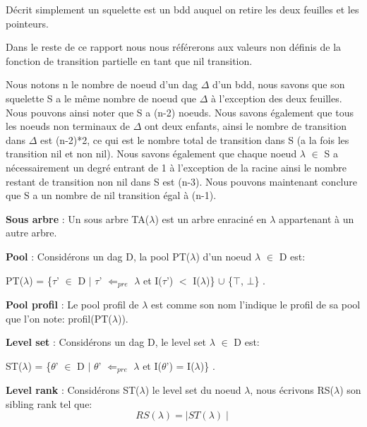 \documentclass[french]{article}
\begin{document}
Décrit simplement un squelette est un bdd auquel on retire les deux feuilles et les pointeurs.

Dans le reste de ce rapport nous nous référerons aux valeurs non définis de la fonction de transition partielle en tant que nil transition.
\vspace{5mm} 

Nous notons n le nombre de noeud d'un dag \(\Delta\) d'un bdd, nous savons que son squelette S a le même nombre de noeud que \(\Delta\) à l'exception des deux feuilles. Nous pouvons ainsi noter que S a (n-2) noeuds. Nous savons également que tous les noeuds non terminaux de \(\Delta\) ont deux enfants, ainsi le nombre de transition dans \(\Delta\) est (n-2)*2, ce qui est le nombre total de transition dans S (a la fois les transition nil et non nil). Nous savons également que chaque noeud \(\lambda\) \(\in\) S a nécessairement un degré entrant de 1 à l'exception de la racine ainsi le nombre restant de transition non nil dans S est (n-3). Nous pouvons maintenant conclure que S a un nombre de nil transition égal à (n-1).
\vspace{5mm} 

\textbf{Sous arbre} : Un sous arbre TA(\(\lambda\)) est un arbre enraciné en \(\lambda\) appartenant à un autre arbre.

\textbf{Pool} : Considérons un dag D, la pool PT(\(\lambda\)) d'un noeud \(\lambda\) \(\in\) D est:

\begin{center}
PT(\(\lambda\)) = \{\(\tau\)’ \(\in\) D \(\mid\)  \(\tau\)’ \(\Leftarrow_{pre}\) \(\lambda\) et I(\(\tau\)’) \(<\) I(\(\lambda\))\} \(\cup\) \{\(\top\), \(\bot\)\} .
\end{center}

\textbf{Pool profil} : Le pool profil de \(\lambda\) est comme son nom l'indique le profil de sa pool que l'on note: profil(PT(\(\lambda\))). 

\textbf{Level set} : Considérons un dag D, le level set \(\lambda\) \(\in\) D est:
\begin{center}
ST(\(\lambda\)) = \{\(\theta\)’ \(\in\) D \(\mid\) \(\theta\)’ \(\Leftarrow_{pre}\) \(\lambda\) et I(\(\theta\)’) = I(\(\lambda\))\} . 
\end{center}
\textbf{Level rank} : Considérons ST(\(\lambda\)) le level set du noeud \(\lambda\), nous écrivons RS(\(\lambda\)) son sibling rank tel que:
\[ RS(\lambda) = \mid ST(\lambda)\mid \]
\end{document}

